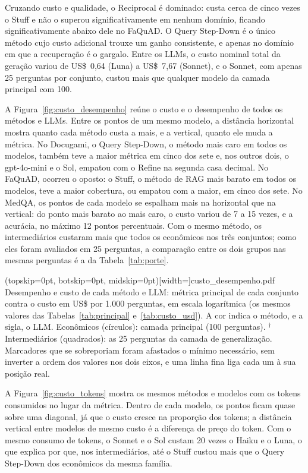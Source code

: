 Cruzando custo e qualidade, o Reciprocal é dominado: custa cerca de cinco vezes o Stuff e não o superou significativamente em nenhum domínio, ficando significativamente abaixo dele no FaQuAD. O Query Step-Down é o único método cujo custo adicional trouxe um ganho consistente, e apenas no domínio em que a recuperação é o gargalo. Entre os LLMs, o custo nominal total da geração variou de US\$~0,64 (Luna) a US\$~7,67 (Sonnet), e o Sonnet, com apenas 25 perguntas por conjunto, custou mais que qualquer modelo da camada principal com 100.

A Figura~\ref{fig:custo_desempenho} reúne o custo e o desempenho de todos os métodos e LLMs. Entre os pontos de um mesmo modelo, a distância horizontal mostra quanto cada método custa a mais, e a vertical, quanto ele muda a métrica. No Docugami, o Query Step-Down, o método mais caro em todos os modelos, também teve a maior métrica em cinco dos sete e, nos outros dois, o gpt-4o-mini e o Sol, empatou com o Refine na segunda casa decimal. No FaQuAD, ocorreu o oposto: o Stuff, o método de RAG mais barato em todos os modelos, teve a maior cobertura, ou empatou com a maior, em cinco dos sete. No MedQA, os pontos de cada modelo se espalham mais na horizontal que na vertical: do ponto mais barato ao mais caro, o custo variou de 7 a 15 vezes, e a acurácia, no máximo 12 pontos percentuais. Com o mesmo método, os intermediários custaram mais que todos os econômicos nos três conjuntos; como eles foram avaliados em 25 perguntas, a comparação entre os dois grupos nas mesmas perguntas é a da Tabela~\ref{tab:porte}.

\Figure[!t](topskip=0pt, botskip=0pt, midskip=0pt)[width=\textwidth]{custo_desempenho.pdf}
{Desempenho e custo de cada método e LLM: métrica principal de cada conjunto contra o custo em US\$ por 1.000 perguntas, em escala logarítmica (os mesmos valores das Tabelas~\ref{tab:principal} e~\ref{tab:custo_usd}). A cor indica o método, e a sigla, o LLM. Econômicos (círculos): camada principal (100 perguntas). $^\dagger$Intermediários (quadrados): as 25 perguntas da camada de generalização. Marcadores que se sobreporiam foram afastados o mínimo necessário, sem inverter a ordem dos valores nos dois eixos, e uma linha fina liga cada um à sua posição real.\label{fig:custo_desempenho}}

A Figura~\ref{fig:custo_tokens} mostra os mesmos métodos e modelos com os tokens consumidos no lugar da métrica. Dentro de cada modelo, os pontos ficam quase sobre uma diagonal, já que o custo cresce na proporção dos tokens; a distância vertical entre modelos de mesmo custo é a diferença de preço do token. Com o mesmo consumo de tokens, o Sonnet e o Sol custam 20 vezes o Haiku e o Luna, o que explica por que, nos intermediários, até o Stuff custou mais que o Query Step-Down dos econômicos da mesma família.

